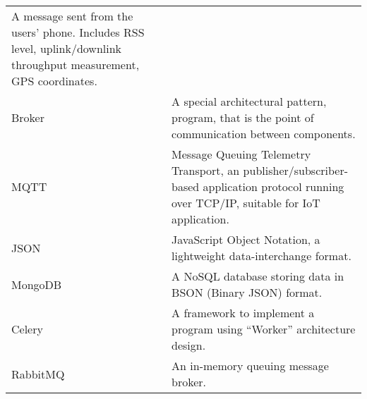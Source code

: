 \begin{longtable}[]{@{}ll@{}}
\begin{minipage}[t]{0.71\columnwidth}
A message sent from the users' phone. Includes RSS level,
uplink/downlink throughput measurement, GPS coordinates.\strut
\end{minipage}\tabularnewline
\begin{minipage}[t]{0.24\columnwidth}\raggedright
Broker\strut
\end{minipage} & \begin{minipage}[t]{0.71\columnwidth}\raggedright
A special architectural pattern, program, that is the point of
communication between components.\strut
\end{minipage}\tabularnewline
\begin{minipage}[t]{0.24\columnwidth}\raggedright
MQTT\strut
\end{minipage} & \begin{minipage}[t]{0.71\columnwidth}\raggedright
Message Queuing Telemetry Transport, an publisher/subscriber-based
application protocol running over TCP/IP, suitable for IoT
application.\strut
\end{minipage}\tabularnewline
\begin{minipage}[t]{0.24\columnwidth}\raggedright
JSON\strut
\end{minipage} & \begin{minipage}[t]{0.71\columnwidth}\raggedright
JavaScript Object Notation, a lightweight data-interchange format.\strut
\end{minipage}\tabularnewline
\begin{minipage}[t]{0.24\columnwidth}\raggedright
MongoDB\strut
\end{minipage} & \begin{minipage}[t]{0.71\columnwidth}\raggedright
A NoSQL database storing data in BSON (Binary JSON) format.\strut
\end{minipage}\tabularnewline
\begin{minipage}[t]{0.24\columnwidth}\raggedright
Celery\strut
\end{minipage} & \begin{minipage}[t]{0.71\columnwidth}\raggedright
A framework to implement a program using ``Worker'' architecture
design.\strut
\end{minipage}\tabularnewline
\begin{minipage}[t]{0.24\columnwidth}\raggedright
RabbitMQ\strut
\end{minipage} & \begin{minipage}[t]{0.71\columnwidth}\raggedright
An in-memory queuing message broker.\strut
\end{minipage}\tabularnewline

\end{longtable}
